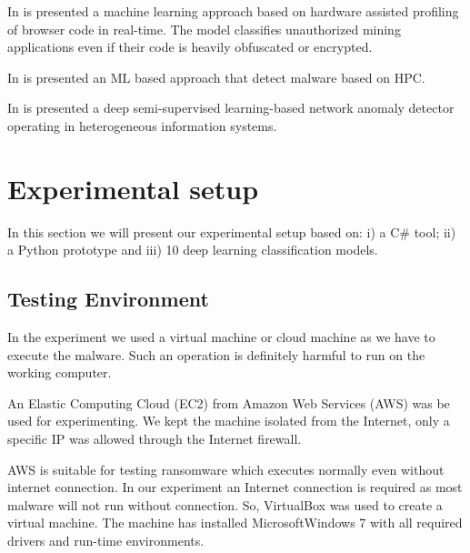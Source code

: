 \documentclass[conference]{IEEEtran}
\begin{document}
In \cite{Tahir2019} is presented a machine learning approach based on hardware assisted profiling of browser code in real-time. The model classifies unauthorized mining applications even if their code is heavily obfuscated or encrypted.

In \cite{Patel2017} is presented an ML based approach that detect malware based on HPC.

In \cite{Lutsiv2022} is presented a deep semi-supervised learning-based network anomaly detector operating in heterogeneous information systems.

\section{Experimental setup}
\label{sec:experimental-setup}
In this section we will present our experimental setup based on: i) a C\# tool; ii) a Python prototype and iii) 10 deep learning classification models.

\subsection{Testing Environment}\label{sub:TE}
In the experiment we used a virtual machine or cloud machine as we have to execute the malware. 
Such an operation is definitely harmful to run on the working computer.

An Elastic Computing Cloud (EC2) from Amazon Web Services (AWS) \cite{AWS2021} was be used for experimenting. We kept the machine isolated from the Internet, only a specific IP was allowed through the Internet firewall. 

AWS is suitable for testing ransomware which executes normally even without internet connection. In our experiment an Internet connection is required as most malware will not run without connection. So, VirtualBox \cite{VirtualBox2021} was used to create a virtual machine. The machine has installed Microsoft\texttrademark Windows 7 with all required drivers and run-time environments.
\end{document}

